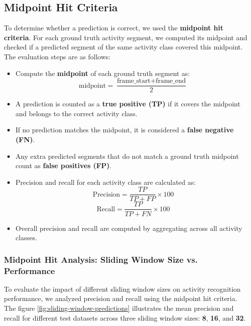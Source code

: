 \documentclass{article}
\begin{document}
\subsection{Midpoint Hit Criteria}

To determine whether a prediction is correct, we used the \textbf{midpoint hit criteria}. For each ground truth activity segment, we computed its midpoint and checked if a predicted segment of the same activity class covered this midpoint. The evaluation steps are as follows:

\begin{itemize}
    \item Compute the \textbf{midpoint} of each ground truth segment as:
    \begin{equation}
        \text{midpoint} = \frac{\text{frame\_start} + \text{frame\_end}}{2}
    \end{equation}
    \item A prediction is counted as a \textbf{true positive (TP)} if it covers the midpoint and belongs to the correct activity class.
    \item If no prediction matches the midpoint, it is considered a \textbf{false negative (FN)}.
    \item Any extra predicted segments that do not match a ground truth midpoint count as \textbf{false positives (FP)}.
    \item Precision and recall for each activity class are calculated as:
    \begin{equation}
        \text{Precision} = \frac{TP}{TP + FP} \times 100
    \end{equation}
    \begin{equation}
        \text{Recall} = \frac{TP}{TP + FN} \times 100
    \end{equation}
    \item Overall precision and recall are computed by aggregating across all activity classes.
\end{itemize}

\subsubsection{Midpoint Hit Analysis: Sliding Window Size vs. Performance}

To evaluate the impact of different sliding window sizes on activity recognition performance, we analyzed precision and recall using the midpoint hit criteria. The figure \ref{fig:sliding-window-predictions} illustrates the mean precision and recall for different test datasets across three sliding window sizes: \textbf{8}, \textbf{16}, and \textbf{32}.
\end{document}

